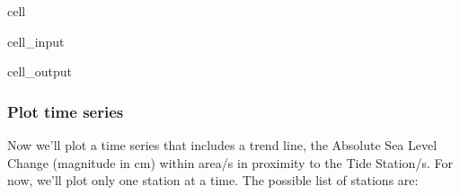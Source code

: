 \documentclass[letterpaper,10pt,english]{jupyterBook}
\begin{document}
\begin{sphinxuseclass}{cell}
\begin{sphinxVerbatimInput}
\begin{sphinxuseclass}{cell_input}
\end{sphinxuseclass}\end{sphinxVerbatimInput}
\begin{sphinxVerbatimOutput}

\begin{sphinxuseclass}{cell_output}
\noindent{}

\end{sphinxuseclass}\end{sphinxVerbatimOutput}

\end{sphinxuseclass}

\subsubsection{Plot time series}
\label{\detokenize{notebooks/regional_and_local/SL_Trend:plot-time-series}}\label{\detokenize{notebooks/regional_and_local/SL_Trend:asltimeseries}}
\sphinxAtStartPar
Now we’ll plot a time series that includes a trend line, the Absolute Sea Level Change (magnitude in cm) within area/s in proximity to the Tide Station/s. For now, we’ll plot only one station at a time. The possible list of stations are:
\end{document}
